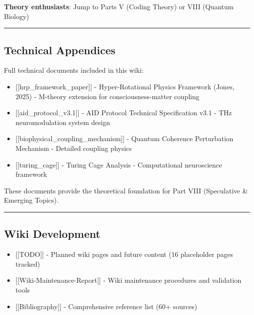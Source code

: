 \textbf{Theory enthusiasts}: Jump to Parts V (Coding Theory) or VIII
(Quantum Biology)

\begin{center}\rule{0.5\linewidth}{0.5pt}\end{center}

\subsection{\texorpdfstring{ Technical
Appendices}{ Technical Appendices}}\label{technical-appendices}

Full technical documents included in this wiki:

\begin{itemize}
\tightlist
\item
  {[}{[}hrp\_framework\_paper{]}{]} - Hyper-Rotational Physics Framework
  (Jones, 2025) - M-theory extension for consciousness-matter coupling
\item
  {[}{[}aid\_protocol\_v3.1{]}{]} - AID Protocol Technical Specification
  v3.1 - THz neuromodulation system design
\item
  {[}{[}biophysical\_coupling\_mechanism{]}{]} - Quantum Coherence
  Perturbation Mechanism - Detailed coupling physics
\item
  {[}{[}turing\_cage{]}{]} - Turing Cage Analysis - Computational
  neuroscience framework
\end{itemize}

These documents provide the theoretical foundation for Part VIII
(Speculative \& Emerging Topics).

\begin{center}\rule{0.5\linewidth}{0.5pt}\end{center}

\subsection{\texorpdfstring{ Wiki
Development}{ Wiki Development}}\label{wiki-development}

\begin{itemize}
\tightlist
\item
  {[}{[}TODO{]}{]} - Planned wiki pages and future content (16
  placeholder pages tracked)
\item
  {[}{[}Wiki-Maintenance-Report{]}{]} - Wiki maintenance procedures and
  validation tools
\item
  {[}{[}Bibliography{]}{]} - Comprehensive reference list (60+ sources)
\end{itemize}
